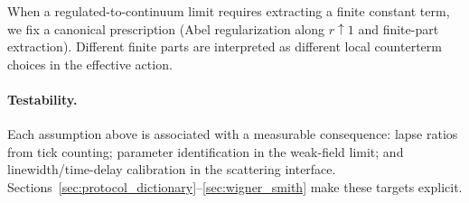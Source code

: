 \begin{assumption}
\label{ass:canonical_regularization}
When a regulated-to-continuum limit requires extracting a finite constant term, we fix a canonical prescription (Abel regularization along $r\uparrow 1$ and finite-part extraction).
Different finite parts are interpreted as different local counterterm choices in the effective action.
\end{assumption}

\paragraph{Testability.}
Each assumption above is associated with a measurable consequence: lapse ratios from tick counting; parameter identification in the weak-field limit; and linewidth/time-delay calibration in the scattering interface.
Sections~\ref{sec:protocol_dictionary}--\ref{sec:wigner_smith} make these targets explicit.


